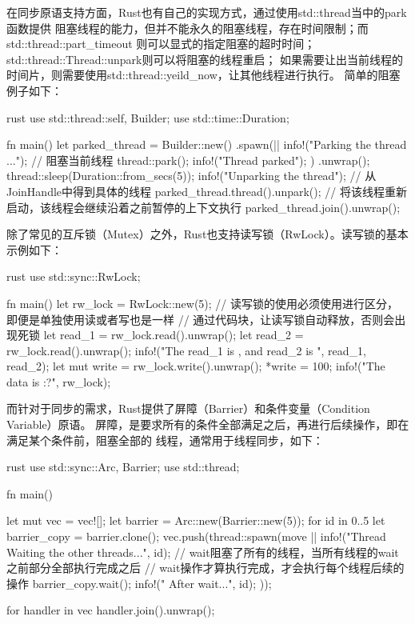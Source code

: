 在同步原语支持方面，Rust也有自己的实现方式，通过使用std::thread当中的park函数提供
阻塞线程的能力，但并不能永久的阻塞线程，存在时间限制；而std::thread::part\_timeout
则可以显式的指定阻塞的超时时间；std::thread::Thread::unpark则可以将阻塞的线程重启；
如果需要让出当前线程的时间片，则需要使用std::thread::yeild\_now，让其他线程进行执行。
简单的阻塞例子如下：
\begin{code-block}{rust}
use std::thread::{self, Builder};
use std::time::Duration;

fn main() {
    let parked_thread = Builder::new()
        .spawn(|| {
            info!("Parking the thread ...");
            // 阻塞当前线程
            thread::park();
            info!("Thread parked");
        })
        .unwrap();
    thread::sleep(Duration::from_secs(5));
    info!("Unparking the thread");
    // 从JoinHandle中得到具体的线程
    parked_thread.thread().unpark();
    // 将该线程重新启动，该线程会继续沿着之前暂停的上下文执行
    parked_thread.join().unwrap();
}
\end{code-block}

除了常见的互斥锁（Mutex）之外，Rust也支持读写锁（RwLock）。读写锁的基本示例如下：
\begin{code-block}{rust}
use std::sync::RwLock;

fn main() {
    let rw_lock = RwLock::new(5);
    // 读写锁的使用必须使用{}进行区分，即便是单独使用读或者写也是一样
    // 通过代码块{}，让读写锁自动释放，否则会出现死锁
    {
        let read_1 = rw_lock.read().unwrap();
        let read_2 = rw_lock.read().unwrap();
        info!("The read_1 is {}, and read_2 is {}", read_1, read_2);
    }
    {
        let mut write = rw_lock.write().unwrap();
        *write = 100;
    }
    info!("The data is {:?}", rw_lock);
}
\end{code-block}

而针对于同步的需求，Rust提供了屏障（Barrier）和条件变量（Condition Variable）原语。
屏障，是要求所有的条件全部满足之后，再进行后续操作，即在满足某个条件前，阻塞全部的
线程，通常用于线程同步，如下：
\begin{code-block}{rust}
use std::sync::{Arc, Barrier};
use std::thread;

fn main() {
    let mut vec = vec![];
    let barrier = Arc::new(Barrier::new(5));
    for id in 0..5 {
        let barrier_copy = barrier.clone();
        vec.push(thread::spawn(move || {
            info!("Thread {} Waiting the other threads...", id);
            // wait阻塞了所有的线程，当所有线程的wait之前部分全部执行完成之后
            // wait操作才算执行完成，才会执行每个线程后续的操作
            barrier_copy.wait();
            info!("{} After wait...", id);
        }));
    }

    for handler in vec {
        handler.join().unwrap();
    }
}
\end{code-block}


